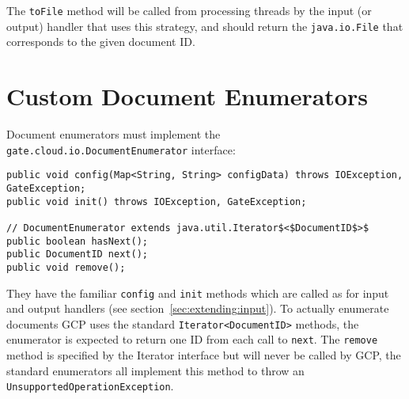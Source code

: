 The \verb!toFile! method will be called from processing threads by the input
(or output) handler that uses this strategy, and should return the
\verb!java.io.File! that corresponds to the given document ID.


\section{Custom Document Enumerators}

Document enumerators must implement the \verb!gate.cloud.io.DocumentEnumerator!
interface:

\begin{lstlisting}[breaklines, texcl]
public void config(Map<String, String> configData) throws IOException, GateException;
public void init() throws IOException, GateException;

// DocumentEnumerator extends java.util.Iterator$<$DocumentID$>$
public boolean hasNext();
public DocumentID next();
public void remove();
\end{lstlisting}

They have the familiar \verb!config! and \verb!init! methods which are called
as for input and output handlers (see section~\ref{sec:extending:input}).  To
actually enumerate documents GCP uses the standard \verb!Iterator<DocumentID>!
methods, the enumerator is expected to return one ID from each call to
\verb!next!.  The \verb!remove! method is specified by the Iterator interface
but will never be called by GCP, the standard enumerators all implement this
method to throw an \verb!UnsupportedOperationException!.

